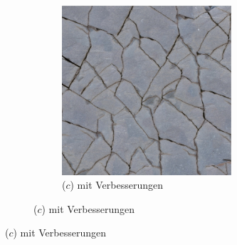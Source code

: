 \begin{figure}
\begin{subfigure}{0.9\textwidth}
\begin{subfigure}{0.3\textwidth}
		\includegraphics[width=0.9\textwidth]{images/example-1-with}
		\caption*{($c$) mit Verbesserungen}
	\end{subfigure}
	

\end{subfigure}
\end{figure}
